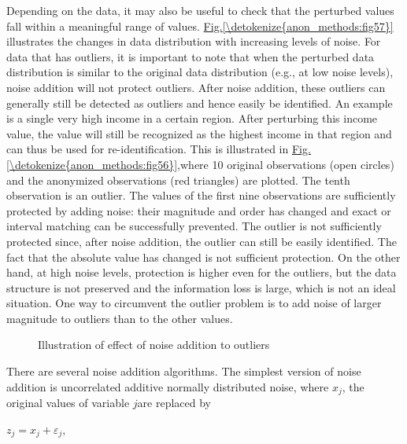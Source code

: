 \documentclass[letterpaper,10pt,english]{sphinxmanual}
\begin{document}
Depending on the data, it may also be useful to check that the perturbed
values fall within a meaningful range of values. \hyperref[\detokenize{anon_methods:fig57}]{Fig.\@ \ref{\detokenize{anon_methods:fig57}}}
illustrates the changes in data distribution with increasing levels of
noise. For data that has outliers, it is important to note that when the
perturbed data distribution is similar to the original data distribution
(e.g., at low noise levels), noise addition will not protect outliers.
After noise addition, these outliers can generally still be detected as
outliers and hence easily be identified. An example is a single very
high income in a certain region. After perturbing this income value, the
value will still be recognized as the highest income in that region and
can thus be used for re-identification. This is illustrated in \hyperref[\detokenize{anon_methods:fig56}]{Fig.\@ \ref{\detokenize{anon_methods:fig56}}},where 10 original observations (open circles) and the anonymized
observations (red triangles) are plotted. The tenth observation is an
outlier. The values of the first nine observations are sufficiently
protected by adding noise: their magnitude and order has changed and
exact or interval matching can be successfully prevented. The outlier is
not sufficiently protected since, after noise addition, the outlier can
still be easily identified. The fact that the absolute value has changed
is not sufficient protection. On the other hand, at high noise levels,
protection is higher even for the outliers, but the data structure is
not preserved and the information loss is large, which is not an ideal
situation. One way to circumvent the outlier problem is to add noise of
larger magnitude to outliers than to the other values.

\begin{figure}[htbp]
\centering
\capstart

\noindent{}
\caption{Illustration of effect of noise addition to outliers}\label{\detokenize{anon_methods:fig56}}\label{\detokenize{anon_methods:id41}}\end{figure}

There are several noise addition algorithms. The simplest version of
noise addition is uncorrelated additive normally distributed noise,
where \(x_{j}\), the original values of variable
\(j\)are replaced by

\(z_{j} = x_{j} + \varepsilon_{j}\),
\end{document}
